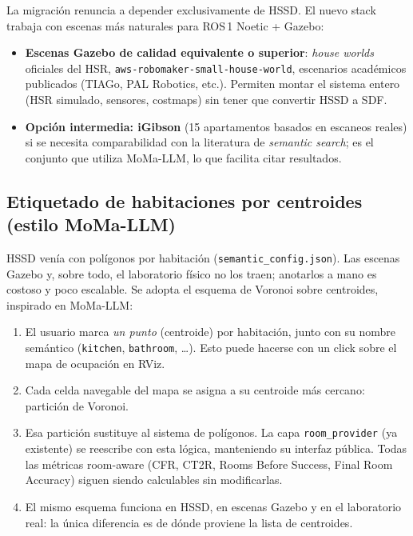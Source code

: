 \documentclass[11pt,a4paper]{article}
\begin{document}
La migración renuncia a depender exclusivamente de HSSD. El nuevo stack
trabaja con escenas más naturales para ROS\,1 Noetic + Gazebo:

\begin{itemize}
  \item \textbf{Escenas Gazebo de calidad equivalente o superior}: \emph{house
        worlds} oficiales del HSR, \texttt{aws-robomaker-small-house-world},
        escenarios académicos publicados (TIAGo, PAL Robotics, etc.). Permiten
        montar el sistema entero (HSR simulado, sensores, costmaps) sin tener
        que convertir HSSD a SDF.
  \item \textbf{Opción intermedia: iGibson} (15 apartamentos basados en
        escaneos reales) si se necesita comparabilidad con la literatura de
        \emph{semantic search}; es el conjunto que utiliza MoMa-LLM, lo que
        facilita citar resultados.
\end{itemize}

\subsection*{Etiquetado de habitaciones por centroides (estilo MoMa-LLM)}

HSSD venía con polígonos por habitación (\texttt{semantic\_config.json}). Las
escenas Gazebo y, sobre todo, el laboratorio físico no los traen; anotarlos a
mano es costoso y poco escalable. Se adopta el esquema de Voronoi sobre
centroides, inspirado en MoMa-LLM:

\begin{enumerate}
  \item El usuario marca \emph{un punto} (centroide) por habitación, junto con
        su nombre semántico (\texttt{kitchen}, \texttt{bathroom}, \ldots).
        Esto puede hacerse con un click sobre el mapa de ocupación en RViz.
  \item Cada celda navegable del mapa se asigna a su centroide más cercano:
        partición de Voronoi.
  \item Esa partición sustituye al sistema de polígonos. La capa
        \texttt{room\_provider} (ya existente) se reescribe con esta lógica,
        manteniendo su interfaz pública. Todas las métricas room-aware
        (CFR, CT2R, Rooms Before Success, Final Room Accuracy) siguen siendo
        calculables sin modificarlas.
  \item El mismo esquema funciona en HSSD, en escenas Gazebo y en el laboratorio
        real: la única diferencia es de dónde proviene la lista de centroides.
\end{enumerate}
\end{document}
